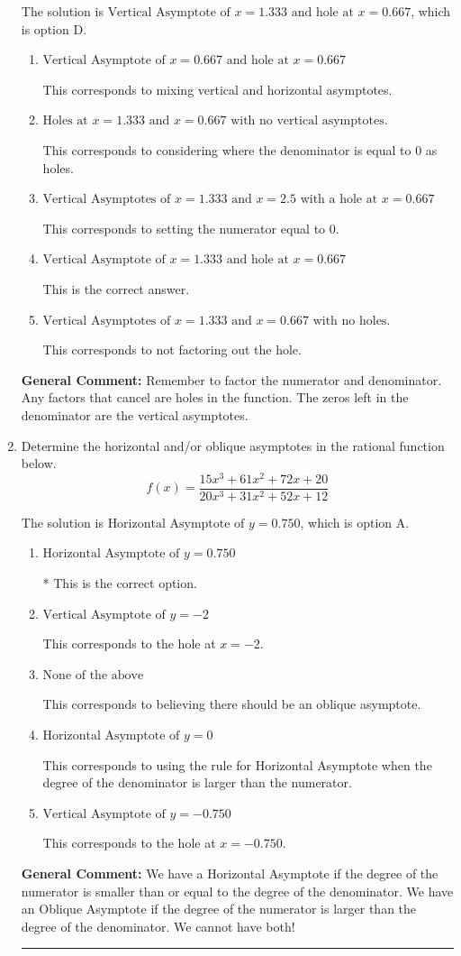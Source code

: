 \documentclass{extbook}[14pt]
\newcommand{\litem}[1]{\item #1

\rule{\textwidth}{0.4pt}}
\begin{document}
\begin{enumerate}
{The solution is \( \text{Vertical Asymptote of } x = 1.333 \text{ and hole at } x = 0.667 \), which is option D.\begin{enumerate}[label=\Alph*.]
\item \( \text{Vertical Asymptote of } x = 0.667 \text{ and hole at } x = 0.667 \)

This corresponds to mixing vertical and horizontal asymptotes.
\item \( \text{Holes at } x = 1.333 \text{ and } x = 0.667 \text{ with no vertical asymptotes.} \)

This corresponds to considering where the denominator is equal to 0 as holes.
\item \( \text{Vertical Asymptotes of } x = 1.333 \text{ and } x = 2.5 \text{ with a hole at } x = 0.667 \)

This corresponds to setting the numerator equal to 0.
\item \( \text{Vertical Asymptote of } x = 1.333 \text{ and hole at } x = 0.667 \)

This is the correct answer.
\item \( \text{Vertical Asymptotes of } x = 1.333 \text{ and } x = 0.667 \text{ with no holes.} \)

This corresponds to not factoring out the hole.
\end{enumerate}

\textbf{General Comment:} Remember to factor the numerator and denominator. Any factors that cancel are holes in the function. The zeros left in the denominator are the vertical asymptotes.
}
\litem{
Determine the horizontal and/or oblique asymptotes in the rational function below.
\[ f(x) = \frac{15x^{3} +61 x^{2} +72 x + 20}{20x^{3} +31 x^{2} +52 x + 12} \]

The solution is \( \text{Horizontal Asymptote of } y = 0.750  \), which is option A.\begin{enumerate}[label=\Alph*.]
\item \( \text{Horizontal Asymptote of } y = 0.750  \)

* This is the correct option.
\item \( \text{Vertical Asymptote of } y = -2  \)

This corresponds to the hole at $x = -2$.
\item \( \text{None of the above} \)

This corresponds to believing there should be an oblique asymptote.
\item \( \text{Horizontal Asymptote of } y = 0  \)

This corresponds to using the rule for Horizontal Asymptote when the degree of the denominator is larger than the numerator.
\item \( \text{Vertical Asymptote of } y = -0.750  \)

This corresponds to the hole at $x = -0.750$.
\end{enumerate}

\textbf{General Comment:} We have a Horizontal Asymptote if the degree of the numerator is smaller than or equal to the degree of the denominator. We have an Oblique Asymptote if the degree of the numerator is larger than the degree of the denominator. We cannot have both!
}
\end{enumerate}
\end{document}

